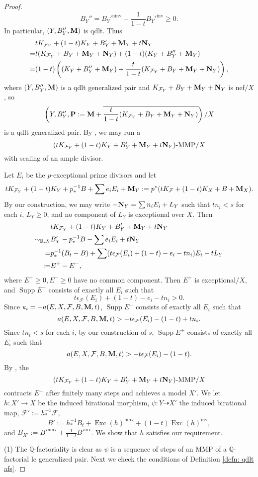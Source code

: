 \documentclass[12pt]{amsart}
\numberwithin{equation}{section}
\newcommand{\Mm}{{\bf{M}}}
\newcommand{\Nn}{{\bf{N}}}
\newcommand{\Pp}{{\bf{P}}}
\newcommand{\Qq}{\mathbb{Q}}
\newcommand{\Exc}{\operatorname{Exc}}
\newcommand{\ninv}{\operatorname{ninv}}
\newcommand{\inv}{\operatorname{inv}}
\newcommand{\Supp}{\operatorname{Supp}}
\newcommand{\Ff}{\mathcal{F}}
\theoremstyle{definition}
\theoremstyle{definition}
\theoremstyle{definition}
\begin{document}
\begin{proof}
$$B_Y''=B_Y'^{\ninv}+\frac{1}{1-t}B_Y'^{\inv}\geq 0.$$ In particular, $(Y,B_Y'',\Mm)$ is qdlt. Thus
\begin{align*}
  &tK_{\Ff_Y}+(1-t)K_Y+B_Y'+\Mm_Y+t\Nn_Y\\
  =&t(K_{\Ff_Y}+B_Y+\Mm_Y+\Nn_Y)+(1-t)(K_Y+B_Y''+\Mm_Y)\\
  =&(1-t)\left((K_Y+B_Y''+\Mm_Y)+\frac{t}{1-t}(K_{\Ff_Y}+B_Y+\Mm_Y+\Nn_Y)\right),
\end{align*}
where $(Y,B_Y'',\Mm)$ is a qdlt generalized pair and $K_{\Ff_Y}+B_Y+\Mm_Y+\Nn_Y$ is nef$/X$, so
$$\left(Y,B_Y'',\Pp:=\Mm+\overline{\frac{t}{1-t}(K_{\Ff_Y}+B_Y+\Mm_Y+\Nn_Y)}\right)/X$$
is a qdlt generalized pair. By \cite[Lemma 4.4]{BZ16}, we may run a 
$$(tK_{\Ff_Y}+(1-t)K_Y+B_Y'+\Mm_Y+t\Nn_Y)\text{-MMP}/X$$
with scaling of an ample divisor.

Let $E_i$ be the $p$-exceptional prime divisors and let
$$tK_{\Ff_Y}+(1-t)K_Y+p^{-1}_*B+\sum e_iE_i+\Mm_Y:=p^*(tK_{\Ff}+(1-t)K_X+B+\Mm_X).$$
By our construction, we may write $-\Nn_Y=\sum n_iE_i+L_Y$ such that $tn_i<s$ for each $i$, $L_Y\geq 0$, and no component of $L_Y$ is exceptional over $X$.
Then
\begin{align*}
&tK_{\Ff_Y}+(1-t)K_Y+B_Y'+\Mm_Y+t\Nn_Y\\
\sim_{\mathbb R,X}&B_Y'-p^{-1}_*B-\sum e_iE_i+t\Nn_Y\\
=&p^{-1}_*(B_t-B)+\sum (t\epsilon_{\Ff}(E_i)+(1-t)-e_i-tn_i)E_i-tL_Y\\
:=&E^+-E^-,
\end{align*}
where $E^+\geq 0,E^{-}\geq 0$ have no common component. Then $E^+$ is exceptional$/X$, and $\Supp E^+$ consists of exactly all $E_i$ such that 
$$t\epsilon_{\Ff}(E_i)+(1-t)-e_i-tn_i>0.$$
Since $e_i=-a(E,X,\Ff,B,\Mm,t)$, $\Supp E^+$ consists of exactly all $E_i$ such that
$$a(E,X,\Ff,B,\Mm,t)>-t\epsilon_{\Ff}(E_i)-(1-t)+tn_i.$$
Since $tn_i<s$ for each $i$, 
by our construction of $s$, $\Supp E^+$ consists of exactly all $E_i$ such that
$$a(E,X,\Ff,B,\Mm,t)>-t\epsilon_{\Ff}(E_i)-(1-t).$$
By \cite[Proposition 3.9]{HL22}, the 
$$(tK_{\Ff_Y}+(1-t)K_Y+B_Y'+\Mm_Y+t\Nn_Y)\text{-MMP}/X$$
contracts $E^+$ after finitely many steps and achieves a model $X'$. We let $h: X'\rightarrow X$ be the induced birational morphism, $\psi: Y\dashrightarrow X'$ the induced birational map, $\Ff':=h^{-1}_*\Ff$, $$B':=h^{-1}_*B_t+\Exc(h)^{\ninv}+(1-t)\Exc(h)^{\inv},$$
and $B_{X'}:=B'^{\ninv}+\frac{1}{1-t}B'^{\inv}$. We show that $h$ satisfies our requirement. 

(1) The $\Qq$-factoriality is clear as $\psi$ is a sequence of steps of an MMP of a  $\Qq$-factorial lc generalized pair. Next we check the conditions of Definition \ref{defn: qdlt afs}.


\end{proof}
\end{document}
